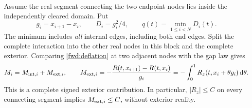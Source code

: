 Assume the real segment connecting the two endpoint nodes lies inside
the independently cleared domain. Put
\begin{equation}
 g_i=x_{i+1}-x_i,\qquad D_i=g_i^2/4,\qquad
 q(t)=\min_{1\le i<N}D_i(t).
 \label{fwd:minimum}
\end{equation}
The minimum includes \emph{all} internal edges, including both end edges.
Split the complete interaction into the other real nodes in this block
and the complete exterior. Comparing \eqref{fwd:deflation} at two adjacent
nodes with the gap law gives
\begin{equation}
 M_i=M_{{\rm int},i}+M_{{\rm ext},i},\qquad
 M_{{\rm ext},i}=-\frac{R(t,x_{i+1})-R(t,x_i)}{g_i}
       =-\int_0^1R_z(t,x_i+\theta g_i)\,\mathrm d\theta.
 \label{fwd:exterior}
\end{equation}
This is a complete signed exterior contribution. In particular,
$|R_z|\le C$ on every connecting segment implies
$M_{{\rm ext},i}\le C$, without exterior reality.

